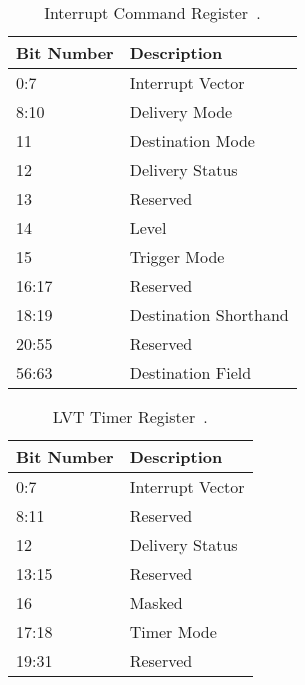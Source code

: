 \begin{table}[H]
  \centering
  \begin{tabularx}{1.0\textwidth}{| X | X |}
    \hline
    \textbf{Bit Number} & \textbf{Description}  \\ \hline\hline
    0:7                 & Interrupt Vector      \\ \hline
    8:10                & Delivery Mode         \\ \hline
    11                  & Destination Mode      \\ \hline
    12                  & Delivery Status       \\ \hline
    13                  & Reserved              \\ \hline
    14                  & Level                 \\ \hline
    15                  & Trigger Mode          \\ \hline
    16:17               & Reserved              \\ \hline
    18:19               & Destination Shorthand \\ \hline
    20:55               & Reserved              \\ \hline
    56:63               & Destination Field     \\ \hline
  \end{tabularx}
  \caption{Interrupt Command Register~\cite[sec.~3.11.6.1]{ia32}.}
  \label{tab:lapicregsicr}
\end{table}

\begin{table}[H]
  \centering
  \begin{tabularx}{1.0\textwidth}{| X | X |}
    \hline
    \textbf{Bit Number} & \textbf{Description} \\ \hline\hline
    0:7                 & Interrupt Vector     \\ \hline
    8:11                & Reserved             \\ \hline
    12                  & Delivery Status      \\ \hline
    13:15               & Reserved             \\ \hline
    16                  & Masked               \\ \hline
    17:18               & Timer Mode           \\ \hline
    19:31               & Reserved             \\ \hline
  \end{tabularx}
  \caption{LVT Timer Register~\cite[sec.~3.11.5.1]{ia32}.}
  \label{tab:lapicregslvtt}
\end{table}


